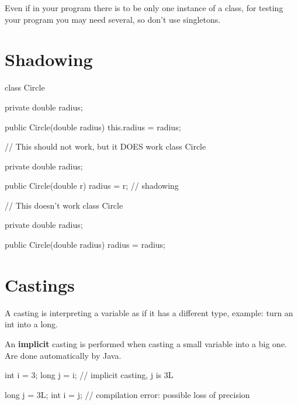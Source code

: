 \documentclass[a4paper, 9pt]{extarticle}
\begin{document}
Even if in your program there is to be only one instance of a class, for
testing your program you may need several, so don't use singletons.








\section{Shadowing}

\begin{multicols}{2}
\begin{blackboard}
class Circle {
  private double radius;

  public Circle(double radius) {
    this.radius = radius;
  }
}
\end{blackboard}
\columnbreak
\begin{blackboard}
// This should not work, but it DOES work
class Circle {
  private double radius;

  public Circle(double r) {
    radius = r;    // shadowing
  }
}
\end{blackboard}
\end{multicols}

\begin{blackboard}
// This doesn't work
class Circle {
  private double radius;

  public Circle(double radius) {
    radius = radius;
  }
}
\end{blackboard}














\section{Castings}

A casting is interpreting a variable as if it has a different type, example:
turn an int into a long.

An \textbf{implicit} casting is performed when casting a small variable into a big one.
Are done automatically by Java.

\begin{blackboard}
int i = 3;
long j = i; // implicit casting, j is 3L

long j = 3L;
int i = j; // compilation error: possible loss of precision
\end{blackboard}
\end{document}
